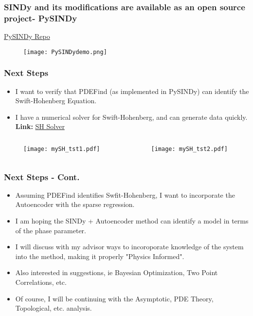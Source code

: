 \documentclass[]{beamer}
\begin{document}
\begin{frame}
    \frametitle{SINDy and its modifications are available as an open source project- PySINDy}
    \href{https://github.com/dynamicslab/pysindy}{PySINDy Repo}
     \begin{figure}
        \centering
        \texttt{[image: PySINDydemo.png]}
    \end{figure}
 \end{frame}

 \begin{frame}
    \frametitle{Next Steps}
    \begin{itemize}
        \item I want to verify that PDEFind (as implemented in PySINDy) can identify the Swift-Hohenberg Equation.
        \item I have a numerical solver for Swift-Hohenberg, and can generate data quickly. \textbf{Link:} \href{https://github.com/EMcDugald/convection_patterns/blob/master/code/main/mySH_v1.py}{SH Solver}
    \end{itemize}
    \begin{columns}[c]
        \begin{column}{.5\textwidth}
            \begin{figure}
                \centering
                \texttt{[image: mySH\_tst1.pdf]}
            \end{figure}
        \end{column}
        \begin{column}{.5\textwidth}
            \begin{figure}
                \centering
                \texttt{[image: mySH\_tst2.pdf]}
            \end{figure}
        \end{column}
    \end{columns}
 \end{frame}
\begin{frame}
    \frametitle{Next Steps - Cont.}
    \begin{itemize}
        \item Assuming PDEFind identifies Swfit-Hohenberg, I want to incorporate the Autoencoder with the sparse regression.
        \item I am hoping the SINDy + Autoencoder method can identify a model in terms of the phase parameter.
        \item I will discuss with my advisor ways to incoroporate knowledge of the system into the method, making it properly "Physics Informed".
        \item Also interested in suggestions, ie Bayesian Optimization, Two Point Correlations, etc.
        \item Of course, I will be continuing with the Asymptotic, PDE Theory, Topological, etc. analysis.
    \end{itemize}
\end{frame}
\end{document}
